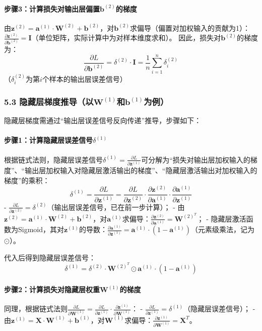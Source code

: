 \documentclass[12pt,a4paper]{article}
\newcommand{\Wone}{\mathbf{W}^{(1)}}    %
\newcommand{\Wtwo}{\mathbf{W}^{(2)}}    %
\newcommand{\bone}{\mathbf{b}^{(1)}}    %
\newcommand{\btwo}{\mathbf{b}^{(2)}}    %
\newcommand{\zone}{\mathbf{z}^{(1)}}    %
\newcommand{\ztwo}{\mathbf{z}^{(2)}}    %
\newcommand{\aone}{\mathbf{a}^{(1)}}    %
\newcommand{\Xinput}{\mathbf{X}}        %
\newcommand{\Loss}{L}                   %
\begin{document}
\paragraph{步骤3：计算损失对输出层偏置\(\btwo\)的梯度}
由\(\ztwo = \aone \cdot \Wtwo + \btwo\)，对\(\btwo\)求偏导（偏置对加权输入的贡献为1）：\(\frac{\partial \ztwo}{\partial \btwo} = \mathbf{I}\)（单位矩阵，实际计算中为对样本维度求和）。  
因此，损失对\(\btwo\)的梯度为：
\[
\frac{\partial \Loss}{\partial \btwo} = \delta^{(2)} \cdot \mathbf{I} = \frac{1}{n} \sum_{i=1}^n \delta^{(2)}_i
\]
（\(\delta^{(2)}_i\)为第\(i\)个样本的输出层误差信号）


\subsubsection{5.3 隐藏层梯度推导（以\(\Wone\)和\(\bone\)为例）}
隐藏层梯度需通过“输出层误差信号反向传递”推导，步骤如下：

\paragraph{步骤1：计算隐藏层误差信号\(\delta^{(1)}\)}
根据链式法则，隐藏层误差信号\(\delta^{(1)} = \frac{\partial \Loss}{\partial \zone}\)可分解为“损失对输出层加权输入的梯度”、“输出层加权输入对隐藏层激活输出的梯度”、“隐藏层激活输出对加权输入的梯度”的乘积：
\[
\delta^{(1)} = \frac{\partial \Loss}{\partial \zone} = \frac{\partial \Loss}{\partial \ztwo} \cdot \frac{\partial \ztwo}{\partial \aone} \cdot \frac{\partial \aone}{\partial \zone}
\]
- \(\frac{\partial \Loss}{\partial \ztwo} = \delta^{(2)}\)（输出层误差信号，已在前一步计算）；
- 由\(\ztwo = \aone \cdot \Wtwo + \btwo\)，对\(\aone\)求偏导：\(\frac{\partial \ztwo}{\partial \aone} = \Wtwo^T\)；
- 隐藏层激活函数为Sigmoid，其对\(\zone\)的导数：\(\frac{\partial \aone}{\partial \zone} = \aone \cdot (1 - \aone)\)（元素级乘法，记为\(\odot\)）。

代入后得到隐藏层误差信号：
\[
\delta^{(1)} = \delta^{(2)} \cdot \Wtwo^T \odot \aone \cdot (1 - \aone)
\]

\paragraph{步骤2：计算损失对隐藏层权重\(\Wone\)的梯度}
同理，根据链式法则\(\frac{\partial \Loss}{\partial \Wone} = \frac{\partial \Loss}{\partial \zone} \cdot \frac{\partial \zone}{\partial \Wone}\)：
- \(\frac{\partial \Loss}{\partial \zone} = \delta^{(1)}\)（隐藏层误差信号）；
- 由\(\zone = \Xinput \cdot \Wone + \bone\)，对\(\Wone\)求偏导：\(\frac{\partial \zone}{\partial \Wone} = \Xinput^T\)。
\end{document}
